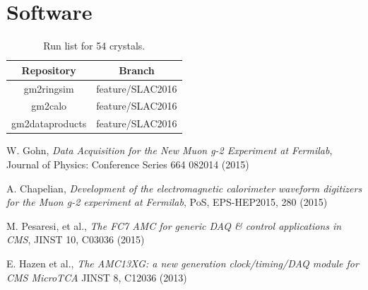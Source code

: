 \section{Software}
\begin{table}[htbp]
\centering
\caption{Run list for 54 crystals.}
\begin{tabular}{|c|c|}
\hline 
Repository & Branch \\
\hline
gm2ringsim & feature/SLAC2016 \\
\hline
gm2calo & feature/SLAC2016 \\
\hline
gm2dataproducts & feature/SLAC2016 \\
\hline
\end{tabular} 
\label{tab:software}
\end{table}


\begin{thebibliography}{99}

W. Gohn, \emph{Data Acquisition for the New Muon g-2 Experiment at Fermilab},
Journal of Physics: Conference Series 664 082014 (2015) 

A. Chapelian, \emph{Development of the electromagnetic calorimeter waveform digitizers for the Muon g-2 experiment at Fermilab},
PoS, EPS-HEP2015, 280 (2015)

M. Pesaresi, et al., \emph{The FC7 AMC for generic DAQ \& control applications in CMS},
JINST 10, C03036 (2015)

E. Hazen et al., \emph{The AMC13XG: a new generation clock/timing/DAQ module for CMS MicroTCA}
JINST 8, C12036 (2013)

\end{thebibliography}



